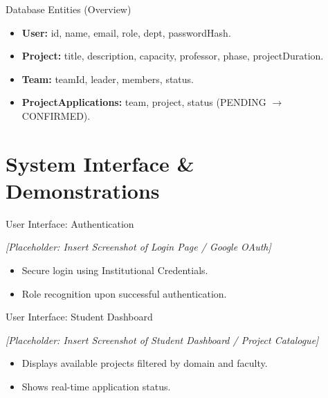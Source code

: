 \documentclass[aspectratio=169]{beamer}
\begin{document}
\begin{frame}{Database Entities (Overview)}
    \begin{itemize}
        \item \textbf{User:} id, name, email, role, dept, passwordHash.
        \item \textbf{Project:} title, description, capacity, professor, phase, projectDuration.
        \item \textbf{Team:} teamId, leader, members, status.
        \item \textbf{ProjectApplications:} team, project, status (PENDING $\rightarrow$ CONFIRMED).
    \end{itemize}
\end{frame}

\section{System Interface \& Demonstrations}

\begin{frame}{User Interface: Authentication}
    \begin{center}
        \textit{[Placeholder: Insert Screenshot of Login Page / Google OAuth]}
    \end{center}
    \vspace{1cm}
    \begin{itemize}
        \item Secure login using Institutional Credentials.
        \item Role recognition upon successful authentication.
    \end{itemize}
\end{frame}

\begin{frame}{User Interface: Student Dashboard}
    \begin{center}
        \textit{[Placeholder: Insert Screenshot of Student Dashboard / Project Catalogue]}
    \end{center}
    \vspace{1cm}
    \begin{itemize}
        \item Displays available projects filtered by domain and faculty.
        \item Shows real-time application status.
    \end{itemize}
\end{frame}
\end{document}
